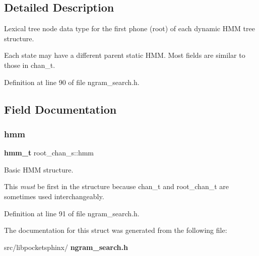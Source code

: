 \subsection{Detailed Description}
Lexical tree node data type for the first phone (root) of each dynamic H\+MM tree structure. 

Each state may have a different parent static H\+MM. Most fields are similar to those in chan\+\_\+t. 

Definition at line 90 of file ngram\+\_\+search.\+h.



\subsection{Field Documentation}
\mbox{\label{structroot__chan__s_a9d4d92ffa8b4079202ddebe3ba0eb290}} 
\subsubsection{hmm}
{\footnotesize\ttfamily \textbf{ hmm\+\_\+t} root\+\_\+chan\+\_\+s\+::hmm}



Basic H\+MM structure. 

This {\itshape must} be first in the structure because chan\+\_\+t and root\+\_\+chan\+\_\+t are sometimes used interchangeably. 

Definition at line 91 of file ngram\+\_\+search.\+h.



The documentation for this struct was generated from the following file\+:\begin{DoxyCompactItemize}
\item 
src/libpocketsphinx/\textbf{ ngram\+\_\+search.\+h}\end{DoxyCompactItemize}
